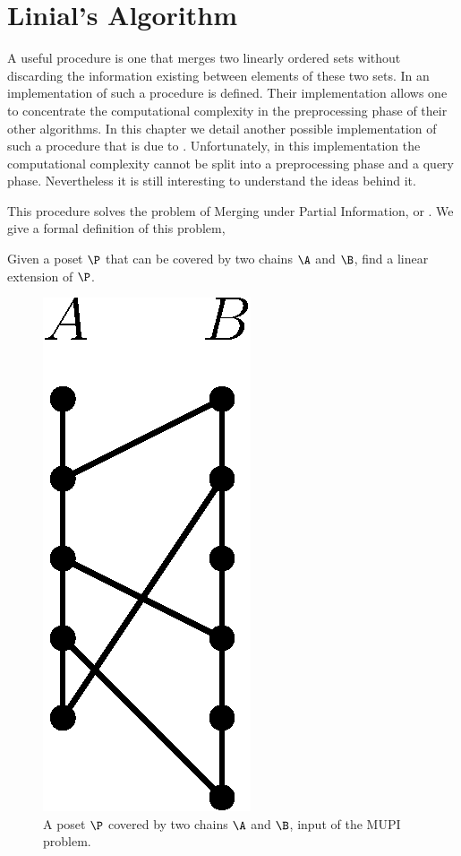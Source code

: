 \section{Linial's Algorithm}

A useful procedure is one that merges two linearly ordered sets without
discarding the information existing between elements of these two sets. In
\citet*{cardinal:2013} an implementation of such a procedure is defined. Their
implementation allows one to concentrate the computational complexity
in the preprocessing phase of their other algorithms. In this chapter
we detail another possible implementation of such a procedure that is due
to \citet*{linial:1984}. Unfortunately, in this implementation the
computational complexity cannot be split into a preprocessing phase and a query
phase. Nevertheless it is still interesting to understand the ideas behind it.

This procedure solves the problem of Merging under Partial Information, or
. We give a formal definition of this problem,

\begin{problem}
Given a poset \(\P\) that can be covered by two chains \(\A\) and \(\B\), find a
linear extension of \(\P\).
\end{problem}

\begin{figure}
\centering
\includegraphics[height=0.2\textheight]{fig/supi/mupi}
\caption{A poset \(\P\) covered by two chains \(\A\) and \(\B\),
input of the MUPI problem.}
\label{fig:supi:mupi}
\end{figure}

